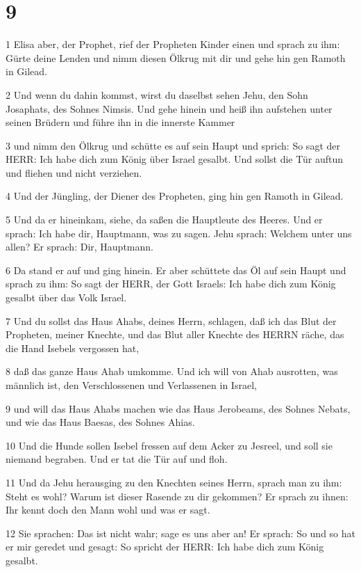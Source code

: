 \chapter{9}

\par 1 Elisa aber, der Prophet, rief der Propheten Kinder einen und sprach zu ihm: Gürte deine Lenden und nimm diesen Ölkrug mit dir und gehe hin gen Ramoth in Gilead.
\par 2 Und wenn du dahin kommst, wirst du daselbst sehen Jehu, den Sohn Josaphats, des Sohnes Nimsis. Und gehe hinein und heiß ihn aufstehen unter seinen Brüdern und führe ihn in die innerste Kammer
\par 3 und nimm den Ölkrug und schütte es auf sein Haupt und sprich: So sagt der HERR: Ich habe dich zum König über Israel gesalbt. Und sollst die Tür auftun und fliehen und nicht verziehen.
\par 4 Und der Jüngling, der Diener des Propheten, ging hin gen Ramoth in Gilead.
\par 5 Und da er hineinkam, siehe, da saßen die Hauptleute des Heeres. Und er sprach: Ich habe dir, Hauptmann, was zu sagen. Jehu sprach: Welchem unter uns allen? Er sprach: Dir, Hauptmann.
\par 6 Da stand er auf und ging hinein. Er aber schüttete das Öl auf sein Haupt und sprach zu ihm: So sagt der HERR, der Gott Israels: Ich habe dich zum König gesalbt über das Volk Israel.
\par 7 Und du sollst das Haus Ahabs, deines Herrn, schlagen, daß ich das Blut der Propheten, meiner Knechte, und das Blut aller Knechte des HERRN räche, das die Hand Isebels vergossen hat,
\par 8 daß das ganze Haus Ahab umkomme. Und ich will von Ahab ausrotten, was männlich ist, den Verschlossenen und Verlassenen in Israel,
\par 9 und will das Haus Ahabs machen wie das Haus Jerobeams, des Sohnes Nebats, und wie das Haus Baesas, des Sohnes Ahias.
\par 10 Und die Hunde sollen Isebel fressen auf dem Acker zu Jesreel, und soll sie niemand begraben. Und er tat die Tür auf und floh.
\par 11 Und da Jehu herausging zu den Knechten seines Herrn, sprach man zu ihm: Steht es wohl? Warum ist dieser Rasende zu dir gekommen? Er sprach zu ihnen: Ihr kennt doch den Mann wohl und was er sagt.
\par 12 Sie sprachen: Das ist nicht wahr; sage es uns aber an! Er sprach: So und so hat er mir geredet und gesagt: So spricht der HERR: Ich habe dich zum König gesalbt.
